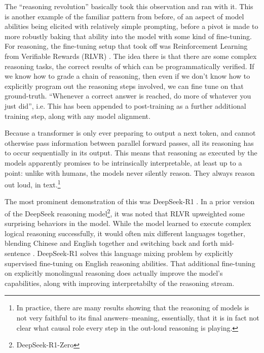 The ``reasoning revolution'' basically took this observation and ran with it.
This is another example of the familiar pattern from before, of an aspect of
model abilities being elicited with relatively simple prompting, before a pivot
is made to more robustly baking that ability into the model with some kind of
fine-tuning. For reasoning, the fine-tuning setup that took off was
Reinforcement Learning from Verifiable Rewards (RLVR) \cite{lambert2025tulu}.
The idea there is that there are some complex reasoning tasks, the correct
results of which can be programmatically verified. If we know how to grade a
chain of reasoning, then even if we don't know how to explicitly program out
the reasoning steps involved, we can fine tune on that ground-truth. ``Whenever
a correct answer is reached, do more of whatever you just did'', i.e. This has
been appended to post-training as a further additional training step, along
with any model alignment.

Because a transformer is only ever preparing to output a next token, and cannot
otherwise pass information between parallel forward passes, all its reasoning
has to occur sequentially in its output. This means that reasoning as executed
by the models apparently promises to be intrinsically interpretable, at least
up to a point: unlike with humans, the models never silently reason. They
always reason out loud, in text.\footnote{In practice, there are many results
showing that the reasoning of models is not very faithful to its final
answers--meaning, essentially, that it is in fact not clear what causal role
every step in the out-loud reasoning is playing.}

The most prominent demonstration of this was DeepSeek-R1
\cite{deepseekai2025deepseek}. In a prior version of the DeepSeek reasoning
model\footnote{DeepSeek-R1-Zero}, it was noted that RLVR upweighted some
surprising behaviors in the model. While the model learned to execute complex
logical reasoning successfully, it would often mix different languages
together, blending Chinese and English together and switching back and forth
mid-sentence \cite{deepseekai2025deepseek}. DeepSeek-R1 solves this language
mixing problem by explicitly supervised fine-tuning on English reasoning
abilities. That additional fine-tuning on explicitly monolingual reasoning does
actually improve the model's capabilities, along with improving interpretabilty
of the reasoning stream.

